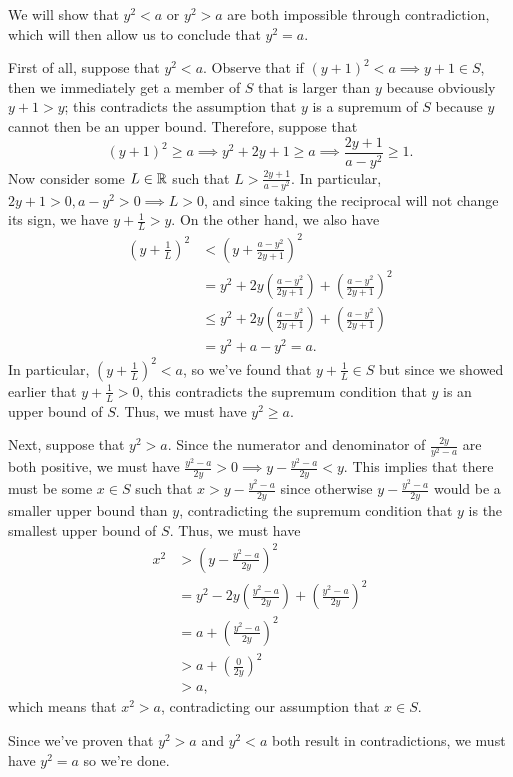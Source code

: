 \documentclass[main.tex]{subfiles}
\begin{document}
\begin{soln}
    We will show that $y^2 < a$ or $y^2 > a$ are both impossible through contradiction, which will then allow us to conclude that $y^2 = a$.
 
    First of all, suppose that $y^2 < a$. Observe that if $(y + 1)^2 < a\implies y + 1\in S$, then we immediately get a member of $S$ that is larger than $y$ because obviously $y + 1 > y$; this contradicts the assumption that $y$ is a supremum of $S$ because $y$ cannot then be an upper bound. Therefore, suppose that
    \[(y + 1)^2 \ge a\implies y^2 + 2y + 1 \ge a\implies \frac{2y + 1}{a - y^2}\ge 1.\]
    Now consider some $L\in \mathbb R$ such that $L > \frac{2y + 1}{a - y^2}$. In particular, $2y + 1 > 0, a - y^2 > 0\implies L > 0$, and since taking the reciprocal will not change its sign, we have $y + \frac{1}{L} > y$. On the other hand, we also have
    \begin{align*}
        \left(y + \frac{1}{L}\right)^2 &< \left(y + \frac{a - y^2}{2y + 1}\right)^2 \\
        &= y^2 + 2y\left(\frac{a - y^2}{2y + 1}\right) + \left(\frac{a - y^2}{2y + 1}\right)^2 \\
        &\le y^2 + 2y\left(\frac{a - y^2}{2y + 1}\right) + \left(\frac{a - y^2}{2y + 1}\right) \\
        &= y^2 + a - y^2 = a.
    \end{align*}
    In particular, $\left(y + \frac{1}{L}\right)^2 < a$, so we've found that $y + \frac{1}{L}\in S$ but since we showed earlier that $y + \frac{1}{L} > 0$, this contradicts the supremum condition that $y$ is an upper bound of $S$. Thus, we must have $y^2\ge a$.

    Next, suppose that $y^2 > a$. Since the numerator and denominator of $\frac{2y}{y^2 - a}$ are both positive, we must have $\frac{y^2 - a}{2y} > 0 \implies y - \frac{y^2 - a}{2y} < y$. This implies that there must be some $x\in S$ such that $x > y - \frac{y^2 - a}{2y}$ since otherwise $y - \frac{y^2 - a}{2y}$ would be a smaller upper bound than $y$, contradicting the supremum condition that $y$ is the smallest upper bound of $S$. Thus, we must have
    \begin{align*}
        x^2 &>\left(y - \frac{y^2 - a}{2y}\right)^2 \\
        &= y^2 - 2y\left(\frac{y^2 - a}{2y}\right) + \left(\frac{y^2 - a}{2y}\right)^2 \\
        &= a + \left(\frac{y^2 - a}{2y}\right)^2 \\
        &> a + \left(\frac{0}{2y}\right)^2 \\
        &> a,
    \end{align*}
    which means that $x^2 > a$, contradicting our assumption that $x\in S$.

    Since we've proven that $y^2 > a$ and $y^2 < a$ both result in contradictions, we must have $y^2 = a$ so we're done.
\end{soln}
\end{document}
